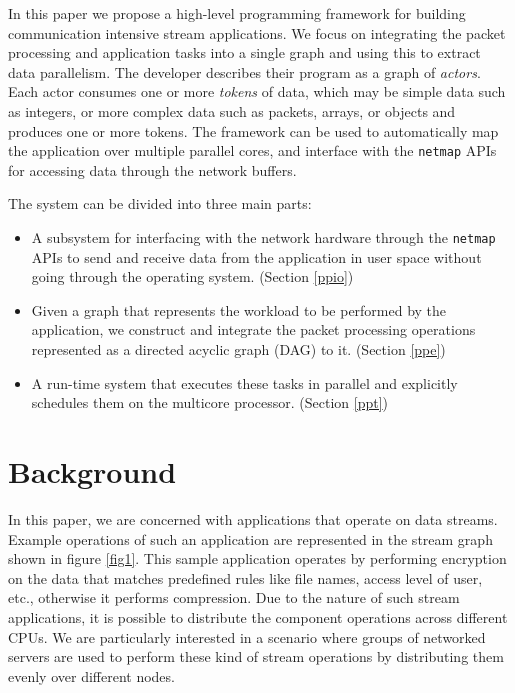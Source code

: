 \documentclass[conference]{IEEEtran}
\begin{document}
In this paper we propose a high-level programming framework for building communication intensive stream applications. We focus on integrating the packet processing and application tasks into a single graph and using this to extract data parallelism. The developer describes their program as a graph of \textit{actors}. Each actor consumes one or more \textit{tokens} of data, which may be simple data such as integers, or more complex data such as packets, arrays, or objects and produces one or more tokens. The framework can be used to automatically map the application over multiple parallel cores, and interface with the \texttt{netmap} APIs \cite{Rizzo:2012:RNI:2090147.2103536} for accessing data through the network buffers.

The system can be divided into three main parts:

\begin{itemize}
\item A subsystem for interfacing with the network hardware through the \texttt{netmap} APIs to send and receive data from the application in user space without going through the operating system. (Section \ref{ppio})
\item Given a graph that represents the workload to be performed by the application, we construct and integrate the packet processing operations represented as a directed acyclic graph (DAG) to it. (Section \ref{ppe})
\item A run-time system that executes these tasks in parallel and explicitly schedules them on the multicore processor. (Section \ref{ppt})
\end{itemize}



\section{Background}

In this paper, we are concerned with applications that operate on data streams. Example operations of such an application are represented in the stream graph shown in figure \ref{fig1}. This sample application operates by performing encryption on the data that matches predefined rules like file names, access level of user, etc., otherwise it performs compression. Due to the nature of such stream applications, it is possible to distribute the component operations across different CPUs. We are particularly interested in a scenario where groups of networked servers are used to perform these kind of stream operations by distributing them evenly over different nodes.
\end{document}
